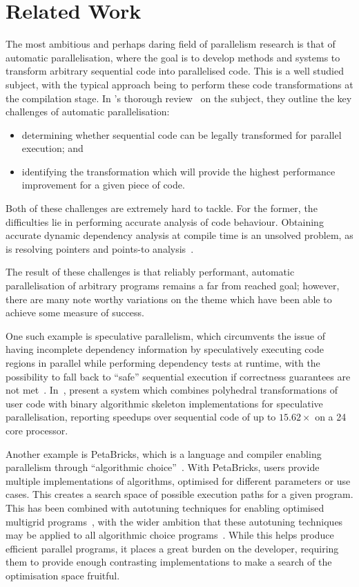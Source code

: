 \chapter{Related Work}
\label{chap:related-work}

The most ambitious and perhaps daring field of parallelism research is
that of automatic parallelisation, where the goal is to develop
methods and systems to transform arbitrary sequential code into
parallelised code. This is a well studied subject, with the typical
approach being to perform these code transformations at the
compilation stage. In \citeauthor{Banerjee1993}'s thorough
review~\cite{Banerjee1993} on the subject, they outline the key
challenges of automatic parallelisation:
%
\begin{itemize}
	\item determining whether sequential code can be legally transformed
	for parallel execution; and
	\item identifying the transformation which will provide the highest
	performance improvement for a given piece of code.
\end{itemize}
%
Both of these challenges are extremely hard to tackle. For the former,
the difficulties lie in performing accurate analysis of code
behaviour. Obtaining accurate dynamic dependency analysis at compile
time is an unsolved problem, as is resolving pointers and points-to
analysis~\cite{Atkin-granville2013, Hind2001,Ghiya2001}.

The result of these challenges is that reliably performant, automatic
parallelisation of arbitrary programs remains a far from reached goal;
however, there are many note worthy variations on the theme which have
been able to achieve some measure of success.

One such example is speculative parallelism, which circumvents the
issue of having incomplete dependency information by speculatively
executing code regions in parallel while performing dependency tests
at runtime, with the possibility to fall back to ``safe'' sequential
execution if correctness guarantees are not
met~\cite{Prabhu2010,Trachsel2010}.  In~\cite{Jimborean2014},
\citeauthor{Jimborean2014} present a system which combines polyhedral
transformations of user code with binary algorithmic skeleton
implementations for speculative parallelisation, reporting speedups
over sequential code of up to $15.62\times$ on a 24 core processor.

Another example is PetaBricks, which is a language and compiler
enabling parallelism through ``algorithmic choice''~\cite{Ansel2009,
	Ansel2010}. With PetaBricks, users provide multiple implementations
of algorithms, optimised for different parameters or use cases. This
creates a search space of possible execution paths for a given
program. This has been combined with autotuning techniques for
enabling optimised multigrid programs~\cite{Chan2009}, with the wider
ambition that these autotuning techniques may be applied to all
algorithmic choice programs~\cite{Ansel2014}. While this helps produce
efficient parallel programs, it places a great burden on the
developer, requiring them to provide enough contrasting
implementations to make a search of the optimisation space fruitful.

